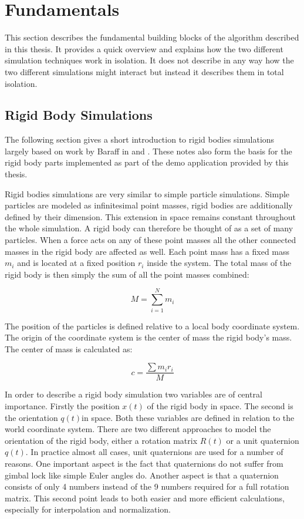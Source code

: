 \chapter{Fundamentals}
\label{cha:fundamentals}

This section describes the fundamental building blocks of the algorithm described in this thesis. It provides a quick overview and explains how the two different simulation techniques work in isolation. It does not describe in any way how the two different simulations might interact but instead it describes them in total isolation.

\section{Rigid Body Simulations}
\label{sec:rigid_body_simulations}

The following section gives a short introduction to rigid bodies simulations largely based on work by Baraff in \cite{Baraff:1997uh} and \cite{Baraff:1997wq}. These notes also form the basis for the rigid body parts implemented as part of the demo application provided by this thesis.

Rigid bodies simulations are very similar to simple particle simulations. Simple particles are modeled as infinitesimal point masses, rigid bodies are additionally defined by their dimension. This extension in space remains constant throughout the whole simulation. A rigid body can therefore be thought of as a set of many particles. When a force acts on any of these point masses all the other connected masses in the rigid body are affected as well. Each point mass has a fixed mass $m_i$ and is located at a fixed position $r_i$ inside the system. The total mass of the rigid body is then simply the sum of all the point masses combined:

\begin{equation}
M = \sum\limits_{i=1}^N m_i
\end{equation}

The position of the particles is defined relative to a local body coordinate system. The origin of the coordinate system is the center of mass the rigid body's mass. The center of mass is calculated as:

\begin{equation}
c = \frac{\sum m_i r_i}{M}
\end{equation}

In order to describe a rigid body simulation two variables are of central importance. Firstly the position \(x(t)\) of the rigid body in space. The second is the orientation \(q(t)\)in space. Both these variables are defined in relation to the world coordinate system. There are two different approaches to model the orientation of the rigid body, either a rotation matrix $R(t)$ or a unit quaternion $q(t)$. In practice almost all cases, unit quaternions are used for a number of reasons. One important aspect is the fact that quaternions do not suffer from gimbal lock like simple Euler angles do. Another aspect is that a quaternion consists of only 4 numbers instead of the 9 numbers required for a full rotation matrix. This second point leads to both easier and more efficient calculations, especially for interpolation and normalization.

